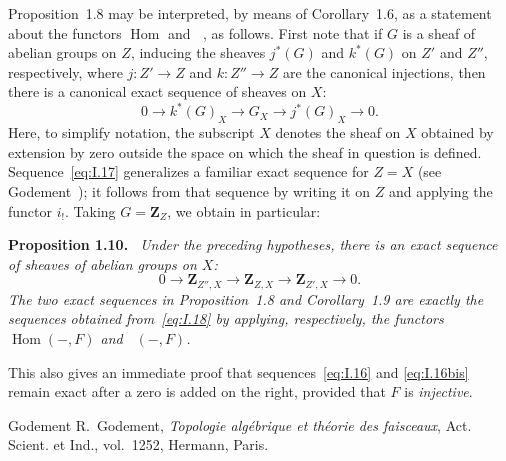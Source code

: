 \documentclass[11pt]{article}
\newcommand{\uHom}{\mathop{\underline{\mathrm{Hom}}}\nolimits}
\newcommand{\ZZ}{\mathbf{Z}}
\newenvironment{sgastatement}[1]
  {\par\addvspace{0.8\baselineskip}\noindent\textbf{#1.}\ \itshape}
  {\par\addvspace{0.4\baselineskip}}
\begin{document}
Proposition~1.8 may be interpreted, by means of Corollary~1.6, as a
statement about the functors $\operatorname{Hom}$ and $\uHom$, as
follows.  First note that if $G$ is a sheaf of abelian groups on $Z$,
inducing the sheaves $j^*(G)$ and $k^*(G)$ on $Z'$ and $Z''$,
respectively, where $j:Z'\to Z$ and $k:Z''\to Z$ are the canonical
injections, then there is a canonical exact sequence of sheaves on $X$:
\begin{equation}
  0\longrightarrow k^*(G)_X
  \longrightarrow G_X
  \longrightarrow j^*(G)_X
  \longrightarrow 0.
  \tag{17}\label{eq:I.17}
\end{equation}
Here, to simplify notation, the subscript $X$ denotes the sheaf on $X$
obtained by extension by zero outside the space on which the sheaf in
question is defined.  Sequence~\eqref{eq:I.17} generalizes a familiar
exact sequence for $Z=X$ (see Godement~\cite{Godement}); it follows from
that sequence by writing it on $Z$ and applying the functor $i_!$.
Taking $G=\ZZ_Z$, we obtain in particular:

\begin{sgastatement}{Proposition 1.10}\label{I.1.10}
Under the preceding hypotheses, there is an exact sequence of sheaves of
abelian groups on $X$:
\begin{equation}
  0\longrightarrow\ZZ_{Z'',X}
  \longrightarrow\ZZ_{Z,X}
  \longrightarrow\ZZ_{Z',X}
  \longrightarrow 0.
  \tag{18}\label{eq:I.18}
\end{equation}
The two exact sequences in Proposition~1.8 and Corollary~1.9 are exactly
the sequences obtained from~\eqref{eq:I.18} by applying, respectively,
the functors $\operatorname{Hom}(-,F)$ and $\uHom(-,F)$.
\end{sgastatement}

This also gives an immediate proof that sequences~\eqref{eq:I.16} and
\eqref{eq:I.16bis} remain exact after a zero is added on the right,
provided that $F$ is \emph{injective}.

\begin{thebibliography}{Godement}
R.~Godement, \emph{Topologie alg\'ebrique et th\'eorie des faisceaux},
Act. Scient. et Ind., vol.~1252, Hermann, Paris.
\end{thebibliography}
\end{document}
